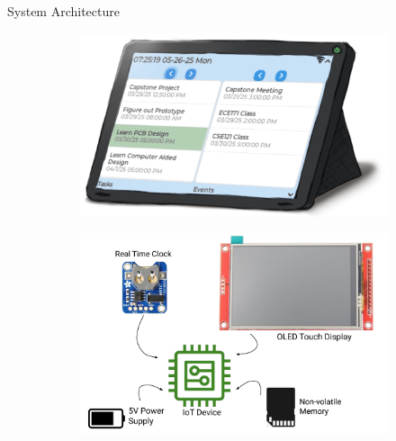\documentclass[final, cmyk]{beamer}
\newlength{\colwidth}
\begin{document}
\begin{frame}[t]
\begin{columns}[t]
\begin{column}{\colwidth}
      \begin{block}{System Architecture}

        \begin{figure}
          \begin{subfigure}[t]{0.6\textwidth}
              \includegraphics[width =\textwidth]{aestheticRender.png}
          \end{subfigure}
          \begin{subfigure}[t]{0.54\textwidth}
              \includegraphics[width =\textwidth]{product_components.pdf}
          \end{subfigure}
          \begin{subfigure}[t]{0.44\textwidth}

\end{subfigure}
\end{figure}
\end{block}
\end{column}
\end{columns}
\end{frame}
\end{document}
